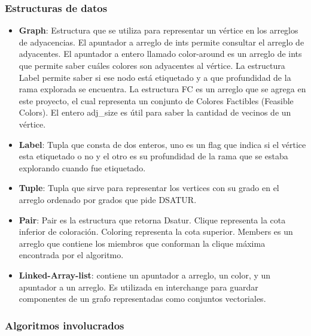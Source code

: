 \documentclass[a4paper,10pt]{article}
\begin{document}
\subsubsection{Estructuras de datos}
\begin{itemize}
 \item \textbf{Graph}: Estructura que se utiliza para representar
       un v\'ertice en los arreglos de adyacencias. El apuntador a arreglo de ints
       permite consultar el arreglo de adyacentes. El apuntador a entero llamado
       color-around es un arreglo de ints que permite saber cuáles colores
       son adyacentes al v\'ertice. La estructura Label permite saber
       si ese nodo est\'a etiquetado y a que profundidad de la rama
       explorada se encuentra. La estructura FC es un arreglo que se agrega en este 
       proyecto, el cual representa un conjunto de Colores Factibles (Feasible Colors).
	El entero adj_size es útil para saber la cantidad de vecinos de un vértice.
 \item \textbf{Label}: Tupla que consta de dos enteros, uno es un flag
       que indica si el v\'ertice esta etiquetado o no y el otro es su
       profundidad de la rama que se estaba explorando cuando fue
       etiquetado.
 \item \textbf{Tuple}: Tupla que sirve para representar los vertices con su 
       grado en el arreglo ordenado por grados que pide DSATUR.
 \item \textbf{Pair}: Pair es la estructura que retorna Dsatur.
       Clique representa la cota inferior de coloración.
       Coloring representa la cota superior.
       Members es un arreglo que contiene los miembros
       que conforman la clique máxima encontrada por el algoritmo.
 \item \textbf{Linked-Array-list}: contiene un apuntador a arreglo, un
       color, y un apuntador a un arreglo. Es utilizada en interchange 
       para guardar componentes de un grafo representadas como conjuntos
       vectoriales.
\end{itemize}
 
\subsubsection{Algoritmos involucrados}
\end{document}

